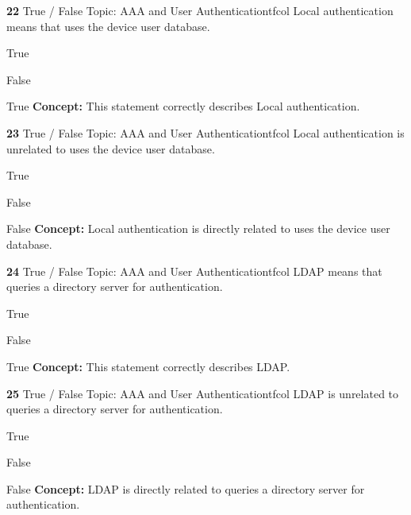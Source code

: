 \documentclass[10pt,a4paper]{article}
\begin{document}
\begin{qcard}{\color{white}\textbf{22} \hfill \small True / False \textbar{} Topic: AAA and User Authentication}{tfcol}
Local authentication means that uses the device user database.

\begin{qoptions}
\item True
\item False
\end{qoptions}
\begin{explainbox}{True}
\textbf{Concept:} This statement correctly describes Local authentication.
\end{explainbox}
\end{qcard}

\begin{qcard}{\color{white}\textbf{23} \hfill \small True / False \textbar{} Topic: AAA and User Authentication}{tfcol}
Local authentication is unrelated to uses the device user database.

\begin{qoptions}
\item True
\item False
\end{qoptions}
\begin{explainbox}{False}
\textbf{Concept:} Local authentication is directly related to uses the device user database.
\end{explainbox}
\end{qcard}

\begin{qcard}{\color{white}\textbf{24} \hfill \small True / False \textbar{} Topic: AAA and User Authentication}{tfcol}
LDAP means that queries a directory server for authentication.

\begin{qoptions}
\item True
\item False
\end{qoptions}
\begin{explainbox}{True}
\textbf{Concept:} This statement correctly describes LDAP.
\end{explainbox}
\end{qcard}

\begin{qcard}{\color{white}\textbf{25} \hfill \small True / False \textbar{} Topic: AAA and User Authentication}{tfcol}
LDAP is unrelated to queries a directory server for authentication.

\begin{qoptions}
\item True
\item False
\end{qoptions}
\begin{explainbox}{False}
\textbf{Concept:} LDAP is directly related to queries a directory server for authentication.
\end{explainbox}
\end{qcard}
\end{document}
